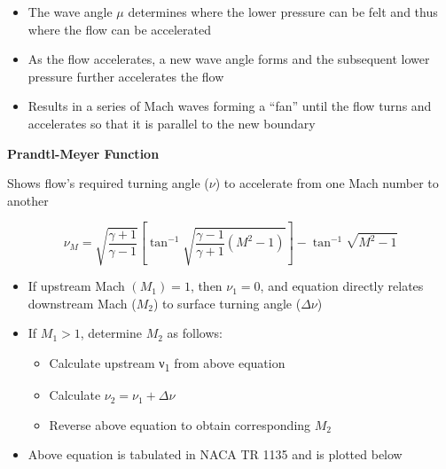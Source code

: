 \documentclass[
]{book}
\providecommand{\tightlist}{%
  \setlength{\itemsep}{0pt}\setlength{\parskip}{0pt}}
\begin{document}
\begin{itemize}
\tightlist
\item
  The wave angle \(\mu\) determines where the lower pressure can be felt and thus where the flow can be accelerated
\item
  As the flow accelerates, a new wave angle forms and the subsequent lower pressure further accelerates the flow
\item
  Results in a series of Mach waves forming a ``fan'' until the flow turns and accelerates so that it is parallel to the new boundary
\end{itemize}

\textbf{Prandtl-Meyer Function}

Shows flow's required turning angle (\(\nu\)) to accelerate from one Mach number to another

\[\nu_M = \sqrt{\frac{\gamma + 1}{\gamma - 1}} \left[\tan^{-1}\sqrt{\frac{\gamma - 1}{\gamma + 1} \left(M^2 - 1\right)} \right] - \tan^{-1}\sqrt{M^2-1} \]

\begin{itemize}
\tightlist
\item
  If upstream Mach \((M_1) = 1\), then \(\nu_1 = 0\), and equation directly relates downstream Mach (\(M_2\)) to surface turning angle (\(\Delta \nu\))
\item
  If \(M_1 > 1\), determine \(M_2\) as follows:

  \begin{itemize}
  \tightlist
  \item
    Calculate upstream ν\textsubscript{1} from above equation
  \item
    Calculate \(\nu_2 = \nu_1 + \Delta \nu\)
  \item
    Reverse above equation to obtain corresponding \(M_2\)
  \end{itemize}
\item
  Above equation is tabulated in NACA TR 1135 and is plotted below
\end{itemize}
\end{document}
